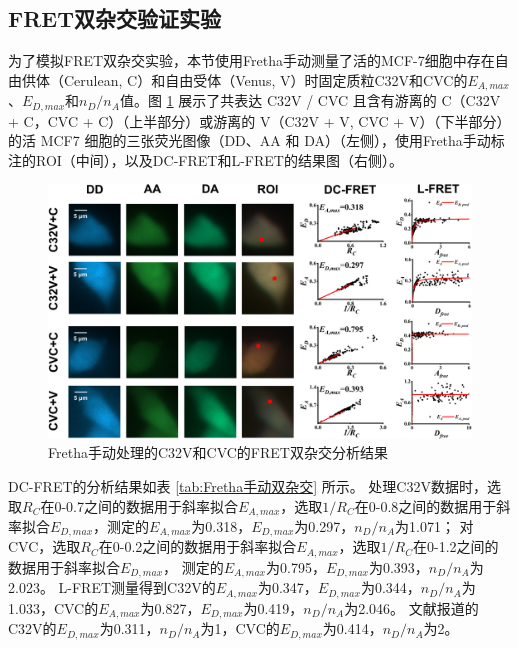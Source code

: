 \subsection{FRET双杂交验证实验}
\label{sec:模型质粒FRET双杂交验证实验}

为了模拟FRET双杂交实验，本节使用Fretha手动测量了活的MCF-7细胞中存在自由供体（Cerulean, C）和自由受体（Venus, V）时固定质粒C32V和CVC的$E_{A,max}$、$E_{D,max}$和$n_D/n_A$值。图 \ref{fig:Fretha手动双杂交} 展示了共表达 C32V / CVC 且含有游离的 C（C32V + C，CVC + C）（上半部分）或游离的 V（C32V + V, CVC + V）（下半部分）的活 MCF7 细胞的三张荧光图像（DD、AA 和 DA）（左侧），使用Fretha手动标注的ROI（中间），以及DC-FRET和L-FRET的结果图（右侧）。
\begin{figure}
  \centering
  \includegraphics[width=1\linewidth]{../figures/3/验证-手动双杂交结果.drawio.png}
  \caption{Fretha手动处理的C32V和CVC的FRET双杂交分析结果}
  \label{fig:Fretha手动双杂交}
\end{figure}

DC-FRET的分析结果如表 \ref{tab:Fretha手动双杂交} 所示。
处理C32V数据时，选取$R_C$在0-0.7之间的数据用于斜率拟合$E_{A,max}$，选取$1/R_C$在0-0.8之间的数据用于斜率拟合$E_{D,max}$，测定的$E_{A,max}$为0.318，$E_{D,max}$为0.297，$n_D/n_A$为1.071；
对CVC，选取$R_C$在0-0.2之间的数据用于斜率拟合$E_{A,max}$，选取$1/R_C$在0-1.2之间的数据用于斜率拟合$E_{D,max}$，
测定的$E_{A,max}$为0.795，$E_{D,max}$为0.393，$n_D/n_A$为2.023。
L-FRET测量得到C32V的$E_{A,max}$为0.347，$E_{D,max}$为0.344，$n_D/n_A$为1.033，CVC的$E_{A,max}$为0.827，$E_{D,max}$为0.419，$n_D/n_A$为2.046。
文献报道的C32V的$E_{D,max}$为0.311，$n_D/n_A$为1，CVC的$E_{D,max}$为0.414，$n_D/n_A$为2。

